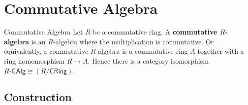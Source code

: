 \section{Commutative Algebra}
\begin{definition}{Commutative Algebra}{}
    Let $R$ be a commutative ring. A \textbf{commutative $R$-algebra} is an $R$-algebra where the multiplication is commutative. Or equivalently, a commutative $R$-algebra is a commutative ring $A$ together with a ring homomorphism $R\to A$. Hence there is a category isomorphism $R\text{-}\mathsf{CAlg}\cong \left(R/\mathsf{CRing}\right)$.
\end{definition}

\subsection{Construction}

